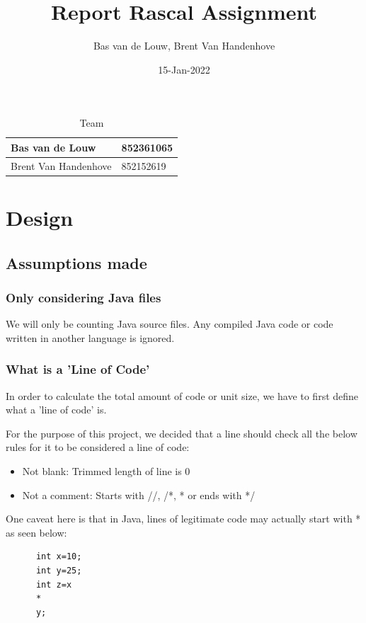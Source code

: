 \documentclass{article}
\title{Report Rascal Assignment}
\author{Bas van de Louw, Brent Van Handenhove}
\date{15-Jan-2022}
\begin{document}
\maketitle

\begin{table}[h!tbp]
	\caption{Team}
	\begin{tabular}{l|l}
		\hline
		Bas van de Louw      & 852361065 \\
		\hline
		Brent Van Handenhove & 852152619 \\
		\hline
	\end{tabular}
\end{table}

\hrulefill{}

\vfill
\clearpage

\tableofcontents
\vfill
\clearpage

\section{Design}

\subsection{Assumptions made}

\subsubsection{Only considering Java files}
We will only be counting Java source files. Any compiled Java code or code written in another language is ignored.

\subsubsection{What is a 'Line of Code'} \label{defining loc}
In order to calculate the total amount of code or unit size, we have to first define what a 'line of code' is.

For the purpose of this project, we decided that a line should check all the below rules for it to be considered a line of code:

\begin{itemize}
\item Not blank: Trimmed length of line is 0
\item Not a comment: Starts with //, /*, * or ends with */
\end{itemize}

One caveat here is that in Java, lines of legitimate code may actually start with * as seen below:
\begin{lstlisting}
      int x=10;
      int y=25;
      int z=x
      *
      y;
\end{lstlisting}
\end{document}
